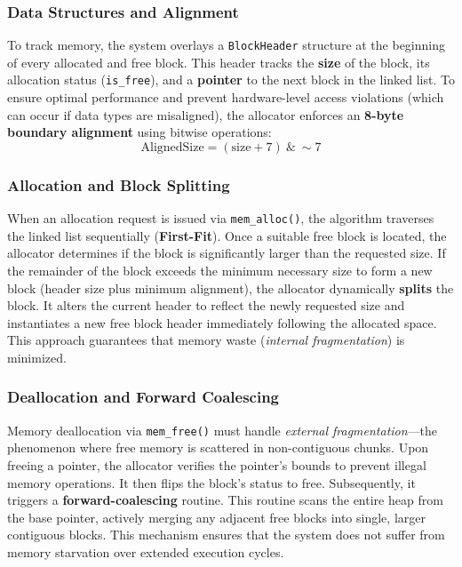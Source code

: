 \documentclass[conference]{IEEEtran}
\begin{document}
\subsubsection{\textbf{Data Structures and Alignment}}
To track memory, the system overlays a \texttt{BlockHeader} structure at the beginning of every allocated and free block. This header tracks the \textbf{size} of the block, its allocation status (\texttt{is\_free}), and a \textbf{pointer} to the next block in the linked list. 
To ensure optimal performance and prevent hardware-level access violations (which can occur if data types are misaligned), the allocator enforces an \textbf{8-byte boundary alignment} using bitwise operations:
\begin{equation}
    \text{AlignedSize} = (\text{size} + 7) \ \& \ \sim7
\end{equation}

\subsubsection{\textbf{Allocation and Block Splitting}}
When an allocation request is issued via \texttt{mem\_alloc()}, the algorithm traverses the linked list sequentially (\textbf{First-Fit}). Once a suitable free block is located, the allocator determines if the block is significantly larger than the requested size. If the remainder of the block exceeds the minimum necessary size to form a new block (header size plus minimum alignment), the allocator dynamically \textbf{splits} the block. It alters the current header to reflect the newly requested size and instantiates a new free block header immediately following the allocated space. This approach guarantees that memory waste (\textit{internal fragmentation}) is minimized.

\subsubsection{\textbf{Deallocation and Forward Coalescing}}
Memory deallocation via \texttt{mem\_free()} must handle \textit{external fragmentation}—the phenomenon where free memory is scattered in non-contiguous chunks. Upon freeing a pointer, the allocator verifies the pointer's bounds to prevent illegal memory operations. It then flips the block's status to free. Subsequently, it triggers a \textbf{forward-coalescing} routine. This routine scans the entire heap from the base pointer, actively merging any adjacent free blocks into single, larger contiguous blocks. This mechanism ensures that the system does not suffer from memory starvation over extended execution cycles.
\end{document}
